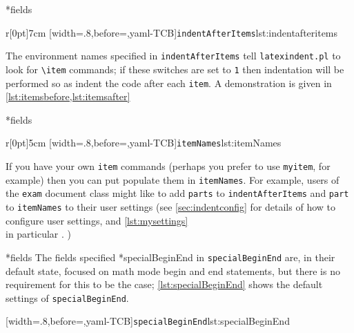 *{fields}
	\begin{wrapfigure}[5]{r}[0pt]{7cm}
		[width=.8\linewidth,before=\centering,yaml-TCB]{\texttt{indentAfterItems}}{lst:indentafteritems}
	\end{wrapfigure}
	The environment names specified in \texttt{indentAfterItems}  tell \texttt{latexindent.pl} to look for \lstinline!\item! commands; if these switches are set to \texttt{1} then indentation will be performed so as indent the code after each \texttt{item}.
	A demonstration is given in \cref{lst:itemsbefore,lst:itemsafter} 

	\begin{minipage}{.45\textwidth}
	\end{minipage} \hfill
	\begin{minipage}{.45\textwidth}
	\end{minipage} 

*{fields} \begin{wrapfigure}[5]{r}[0pt]{5cm} [width=.8\linewidth,before=\centering,yaml-TCB]{\texttt{itemNames}}{lst:itemNames}%
	\end{wrapfigure}
	If you have your own \texttt{item} commands (perhaps you prefer to use \texttt{myitem}, for example) then you can put populate them in \texttt{itemNames}.
	For example, users of the \texttt{exam} document class might like to add \texttt{parts} to \texttt{indentAfterItems} and \texttt{part} to \texttt{itemNames} to their user settings (see \vref{sec:indentconfig} for details of how to configure user settings, and \vref{lst:mysettings} \\ in particular \label{page:examsettings}.
	)

*{fields}\label{yaml:specialBeginEnd}
	The fields specified *{specialBeginEnd} in \texttt{specialBeginEnd} are, in their default state, focused on math mode begin and end statements, but there is no requirement for this to be the case; \cref{lst:specialBeginEnd} shows the default settings of \texttt{specialBeginEnd}.

	[width=.8\linewidth,before=\centering,yaml-TCB]{\texttt{specialBeginEnd}}{lst:specialBeginEnd}

